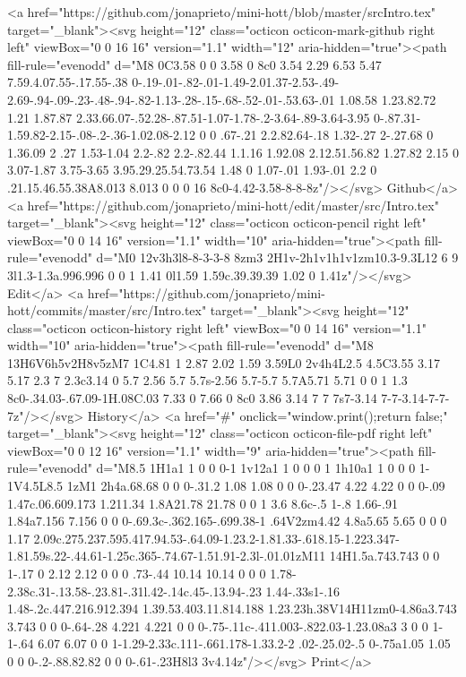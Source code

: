       <a href="https://github.com/jonaprieto/mini-hott/blob/master/srcIntro.tex" target="_blank"><svg height="12" class="octicon octicon-mark-github right left" viewBox="0 0 16 16" version="1.1" width="12" aria-hidden="true"><path fill-rule="evenodd" d="M8 0C3.58 0 0 3.58 0 8c0 3.54 2.29 6.53 5.47 7.59.4.07.55-.17.55-.38 0-.19-.01-.82-.01-1.49-2.01.37-2.53-.49-2.69-.94-.09-.23-.48-.94-.82-1.13-.28-.15-.68-.52-.01-.53.63-.01 1.08.58 1.23.82.72 1.21 1.87.87 2.33.66.07-.52.28-.87.51-1.07-1.78-.2-3.64-.89-3.64-3.95 0-.87.31-1.59.82-2.15-.08-.2-.36-1.02.08-2.12 0 0 .67-.21 2.2.82.64-.18 1.32-.27 2-.27.68 0 1.36.09 2 .27 1.53-1.04 2.2-.82 2.2-.82.44 1.1.16 1.92.08 2.12.51.56.82 1.27.82 2.15 0 3.07-1.87 3.75-3.65 3.95.29.25.54.73.54 1.48 0 1.07-.01 1.93-.01 2.2 0 .21.15.46.55.38A8.013 8.013 0 0 0 16 8c0-4.42-3.58-8-8-8z"/></svg> Github</a>
      <a href="https://github.com/jonaprieto/mini-hott/edit/master/src/Intro.tex" target="_blank"><svg height="12" class="octicon octicon-pencil right left" viewBox="0 0 14 16" version="1.1" width="10" aria-hidden="true"><path fill-rule="evenodd" d="M0 12v3h3l8-8-3-3-8 8zm3 2H1v-2h1v1h1v1zm10.3-9.3L12 6 9 3l1.3-1.3a.996.996 0 0 1 1.41 0l1.59 1.59c.39.39.39 1.02 0 1.41z"/></svg> Edit</a>
      <a href="https://github.com/jonaprieto/mini-hott/commits/master/src/Intro.tex" target="_blank"><svg height="12" class="octicon octicon-history right left" viewBox="0 0 14 16" version="1.1" width="10" aria-hidden="true"><path fill-rule="evenodd" d="M8 13H6V6h5v2H8v5zM7 1C4.81 1 2.87 2.02 1.59 3.59L0 2v4h4L2.5 4.5C3.55 3.17 5.17 2.3 7 2.3c3.14 0 5.7 2.56 5.7 5.7s-2.56 5.7-5.7 5.7A5.71 5.71 0 0 1 1.3 8c0-.34.03-.67.09-1H.08C.03 7.33 0 7.66 0 8c0 3.86 3.14 7 7 7s7-3.14 7-7-3.14-7-7-7z"/></svg> History</a>
      <a  href="#" onclick="window.print();return false;" target="_blank"><svg height="12" class="octicon octicon-file-pdf right left" viewBox="0 0 12 16" version="1.1" width="9" aria-hidden="true"><path fill-rule="evenodd" d="M8.5 1H1a1 1 0 0 0-1 1v12a1 1 0 0 0 1 1h10a1 1 0 0 0 1-1V4.5L8.5 1zM1 2h4a.68.68 0 0 0-.31.2 1.08 1.08 0 0 0-.23.47 4.22 4.22 0 0 0-.09 1.47c.06.609.173 1.211.34 1.8A21.78 21.78 0 0 1 3.6 8.6c-.5 1-.8 1.66-.91 1.84a7.156 7.156 0 0 0-.69.3c-.362.165-.699.38-1 .64V2zm4.42 4.8a5.65 5.65 0 0 0 1.17 2.09c.275.237.595.417.94.53-.64.09-1.23.2-1.81.33-.618.15-1.223.347-1.81.59s.22-.44.61-1.25c.365-.74.67-1.51.91-2.3l-.01.01zM11 14H1.5a.743.743 0 0 1-.17 0 2.12 2.12 0 0 0 .73-.44 10.14 10.14 0 0 0 1.78-2.38c.31-.13.58-.23.81-.31l.42-.14c.45-.13.94-.23 1.44-.33s1-.16 1.48-.2c.447.216.912.394 1.39.53.403.11.814.188 1.23.23h.38V14H11zm0-4.86a3.743 3.743 0 0 0-.64-.28 4.221 4.221 0 0 0-.75-.11c-.411.003-.822.03-1.23.08a3 3 0 0 1-1-.64 6.07 6.07 0 0 1-1.29-2.33c.111-.661.178-1.33.2-2 .02-.25.02-.5 0-.75a1.05 1.05 0 0 0-.2-.88.82.82 0 0 0-.61-.23H8l3 3v4.14z"/></svg> Print</a>
